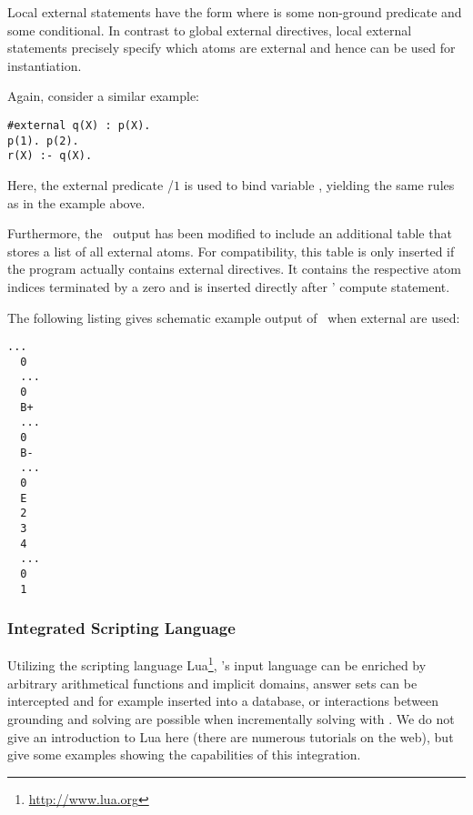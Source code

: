 Local external statements have the form  where
 is some non-ground predicate and  some conditional.
In contrast to global external directives, local external statements precisely specify 
which atoms are external and hence can be used for instantiation.
\begin{example}
Again, consider a similar example:
\begin{lstlisting}[numbers=none]
#external q(X) : p(X).
p(1). p(2).
r(X) :- q(X).
\end{lstlisting}
Here, the external predicate /$1$ is used to bind variable , 
yielding the same rules as in the example above.
\eexample
\end{example}

Furthermore, the \lparse\ output\cite{lparseManual} has been modified to include an additional table 
that stores a list  of all external atoms. For compatibility, this table is only inserted if the 
program actually contains external directives. It contains the respective atom indices terminated
by a zero and is inserted directly after \lparse' compute statement.
\begin{example}
The following listing gives schematic example output of \gringo\ when external are used:
\begin{lstlisting}[numbers=none]
  ...
  0
  ...
  0
  B+
  ...
  0
  B-
  ...
  0
  E
  2
  3
  4
  ...
  0
  1
\end{lstlisting}
\eexample
\end{example}

\subsubsection{Integrated Scripting Language}\label{subsec:lang:lua}
%
Utilizing the scripting language Lua\footnote{\url{http://www.lua.org}}, 
\gringo's input language can be enriched by arbitrary arithmetical functions and implicit domains,
answer sets can be intercepted and for example inserted into a database, or
interactions between grounding and solving are possible when incrementally solving with \iclingo.
We do not give an introduction to Lua here (there are numerous tutorials on the web), 
but give some examples showing the capabilities of this integration.


